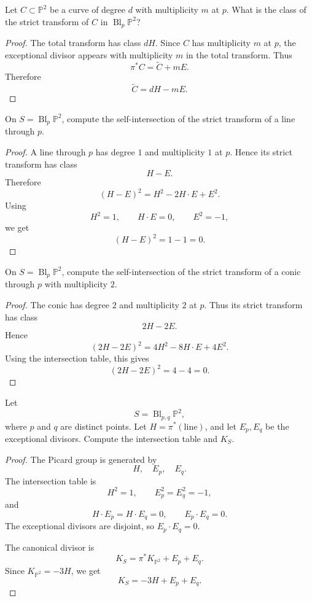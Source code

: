 \begin{exercise}
\label{exercise-blowup-strict-transform}
Let $C\subset \mathbb P^2$ be a curve
of degree $d$ with multiplicity $m$ at
$p$. What is the class of the strict
transform of $C$ in
$\operatorname{Bl}_p\mathbb P^2$?
\end{exercise}

\begin{proof}
The total transform has class $dH$.
Since $C$ has multiplicity $m$ at $p$,
the exceptional divisor appears with
multiplicity $m$ in the total transform.
Thus
$$
  \pi^*C=\widetilde C+mE.
$$
Therefore
$$
  \widetilde C=dH-mE.
$$
\end{proof}

\begin{exercise}
\label{exercise-blowup-line}
On $S=\operatorname{Bl}_p\mathbb P^2$,
compute the self-intersection of the
strict transform of a line through $p$.
\end{exercise}

\begin{proof}
A line through $p$ has degree $1$ and
multiplicity $1$ at $p$. Hence its
strict transform has class
$$
  H-E.
$$
Therefore
$$
  (H-E)^2
  =
  H^2-2H\cdot E+E^2.
$$
Using
$$
  H^2=1,
  \qquad
  H\cdot E=0,
  \qquad
  E^2=-1,
$$
we get
$$
  (H-E)^2=1-1=0.
$$
\end{proof}

\begin{exercise}
\label{exercise-blowup-conic}
On $S=\operatorname{Bl}_p\mathbb P^2$,
compute the self-intersection of the
strict transform of a conic through $p$
with multiplicity $2$.
\end{exercise}

\begin{proof}
The conic has degree $2$ and multiplicity
$2$ at $p$. Thus its strict transform has
class
$$
  2H-2E.
$$
Hence
$$
  (2H-2E)^2
  =
  4H^2-8H\cdot E+4E^2.
$$
Using the intersection table, this gives
$$
  (2H-2E)^2=4-4=0.
$$
\end{proof}

\begin{exercise}
\label{exercise-two-point-blowup}
Let
$$
  S=\operatorname{Bl}_{p,q}\mathbb P^2,
$$
where $p$ and $q$ are distinct points.
Let $H=\pi^*(\text{line})$, and let
$E_p,E_q$ be the exceptional divisors.
Compute the intersection table and
$K_S$.
\end{exercise}

\begin{proof}
The Picard group is generated by
$$
  H,\quad E_p,\quad E_q.
$$
The intersection table is
$$
  H^2=1,
  \qquad
  E_p^2=E_q^2=-1,
$$
and
$$
  H\cdot E_p=H\cdot E_q=0,
  \qquad
  E_p\cdot E_q=0.
$$
The exceptional divisors are disjoint,
so $E_p\cdot E_q=0$.

The canonical divisor is
$$
  K_S=\pi^*K_{\mathbb P^2}+E_p+E_q.
$$
Since $K_{\mathbb P^2}=-3H$, we get
$$
  K_S=-3H+E_p+E_q.
$$
\end{proof}

